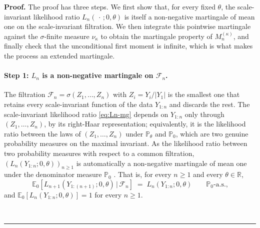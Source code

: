 \documentclass{article}%
\newenvironment{proof}[1][Proof]{\noindent\textbf{#1.} }{\ \rule{0.5em}{0.5em}}
\newcommand{\1}{\mathbf{1}}
\begin{document}
\begin{proof}
The proof has three steps. We first show that, for every fixed $\theta$,
the scale-invariant likelihood ratio $L_n(\,\cdot\,;0,\theta)$ is itself a
non-negative martingale of mean one on the scale-invariant filtration. We then
integrate this pointwise martingale against the $\sigma$-finite measure
$\nu_\kappa$ to obtain the martingale property of $M_n^{(\kappa)}$, and finally
check that the unconditional first moment is infinite, which is what makes the process an extended martingale.

\paragraph{Step 1: $L_n$ is a non-negative martingale on $\mathcal{F}_n$.}
The filtration $\mathcal{F}_n = \sigma(Z_1,\dots,Z_n)$ with $Z_i = Y_i/|Y_1|$
is the smallest one that retains every scale-invariant function of the data
$Y_{1:n}$ and discards the rest. The scale-invariant likelihood ratio
\eqref{eq:Ln-mg} depends on $Y_{1:n}$ only through $(Z_1,\dots,Z_n)$, by its
right-Haar representation; equivalently, it is the likelihood ratio between
the laws of $(Z_1,\dots,Z_n)$ under $\mathbb{P}_\theta$ and $\mathbb{P}_0$,
which are two genuine probability measures on the maximal invariant. As the
likelihood ratio between two probability measures with respect to a common
filtration, $(L_n(Y_{1:n};0,\theta))_{n\geq 1}$ is automatically a non-negative
martingale of mean one under the denominator measure $\mathbb{P}_0$
\citep[Cor.~4.6]{Wang2025}. That is, for every $n\geq 1$ and every
$\theta\in\mathbb{R}$,
\begin{equation}\label{eq:Ln-mg}
   \mathbb{E}_0\!\left[L_{n+1}(Y_{1:(n+1)};0,\theta)\,\big|\,\mathcal{F}_n\right]
   \;=\; L_n(Y_{1:n};0,\theta)
   \qquad\mathbb{P}_0\text{-a.s.,}
\end{equation}
and $\mathbb{E}_0[L_n(Y_{1:n};0,\theta)] = 1$ for every $n\geq 1$.


\end{proof}
\end{document}
